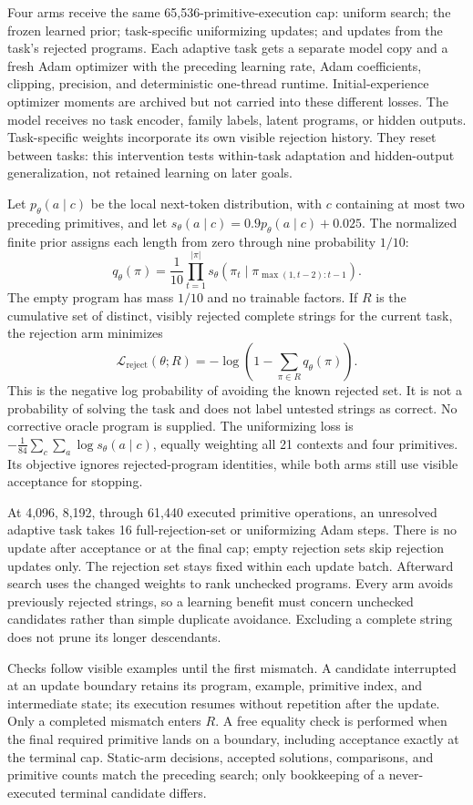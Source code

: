 \documentclass[11pt]{article}
\begin{document}
Four arms receive the same 65,536-primitive-execution cap: uniform search;
the frozen learned prior; task-specific uniformizing updates; and updates
from the task's rejected programs. Each adaptive task gets a separate model
copy and a fresh Adam optimizer with the preceding learning rate, Adam coefficients,
clipping, precision, and deterministic one-thread runtime. Initial-experience
optimizer moments are archived but not carried into these different losses.
The model receives no task encoder, family labels, latent programs, or hidden
outputs. Task-specific weights incorporate its own visible rejection history.
They reset between tasks: this intervention tests within-task adaptation and
hidden-output generalization, not retained learning on later goals.

Let $p_\theta(a\mid c)$ be the local next-token distribution, with
$c$ containing at most two preceding primitives, and let
$s_\theta(a\mid c)=0.9p_\theta(a\mid c)+0.025$. The normalized finite prior
assigns each length from zero through nine probability $1/10$:
\[
q_\theta(\pi)=\frac{1}{10}\prod_{t=1}^{|\pi|}
 s_\theta(\pi_t\mid\pi_{\max(1,t-2):t-1}).
\]
The empty program has mass $1/10$ and no trainable factors. If $R$ is the
cumulative set of distinct, visibly rejected complete strings for the current
task, the rejection arm minimizes
\[
\mathcal{L}_{\mathrm{reject}}(\theta;R)
=-\log\left(1-\sum_{\pi\in R}q_\theta(\pi)\right).
\]
This is the negative log probability of avoiding the known rejected set. It
is not a probability of solving the task and does not label untested strings
as correct. No corrective oracle program is supplied. The uniformizing loss
is $-\frac{1}{84}\sum_c\sum_a\log s_\theta(a\mid c)$, equally weighting
all 21 contexts and four primitives. Its objective ignores rejected-program
identities, while both arms still use visible acceptance for stopping.

At 4,096, 8,192, through 61,440 executed primitive operations, an unresolved
adaptive task takes 16 full-rejection-set or uniformizing Adam steps. There
is no update after acceptance or at the final cap; empty rejection sets skip
rejection updates only. The rejection set stays fixed within each update batch.
Afterward search uses the changed weights to rank unchecked programs. Every
arm avoids previously rejected strings, so a learning benefit must concern
unchecked candidates rather than simple duplicate avoidance. Excluding a
complete string does not prune its longer descendants.

Checks follow visible examples until the first mismatch. A candidate
interrupted at an update boundary retains its program, example, primitive
index, and intermediate state; its execution resumes without repetition after
the update. Only a completed mismatch enters $R$. A free equality check is
performed when the final required primitive lands on a boundary, including
acceptance exactly at the terminal cap. Static-arm decisions, accepted
solutions, comparisons, and primitive counts match the preceding search;
only bookkeeping of a never-executed terminal candidate differs.
\end{document}

